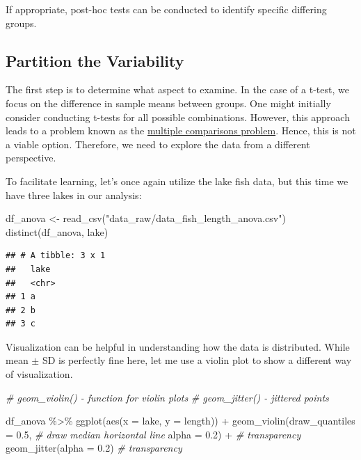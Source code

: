 \documentclass[
]{article}
\newenvironment{Shaded}{\begin{snugshade}}{\end{snugshade}}
\newcommand{\AttributeTok}[1]{\textcolor[rgb]{0.77,0.63,0.00}{#1}}
\newcommand{\CommentTok}[1]{\textcolor[rgb]{0.56,0.35,0.01}{\textit{#1}}}
\newcommand{\FloatTok}[1]{\textcolor[rgb]{0.00,0.00,0.81}{#1}}
\newcommand{\FunctionTok}[1]{\textcolor[rgb]{0.00,0.00,0.00}{#1}}
\newcommand{\NormalTok}[1]{#1}
\newcommand{\OtherTok}[1]{\textcolor[rgb]{0.56,0.35,0.01}{#1}}
\newcommand{\SpecialCharTok}[1]{\textcolor[rgb]{0.00,0.00,0.00}{#1}}
\newcommand{\StringTok}[1]{\textcolor[rgb]{0.31,0.60,0.02}{#1}}
\begin{document}
If appropriate, post-hoc tests can be conducted to identify specific differing groups.

\hypertarget{partition-the-variability}{%
\subsection{Partition the Variability}\label{partition-the-variability}}

The first step is to determine what aspect to examine. In the case of a t-test, we focus on the difference in sample means between groups. One might initially consider conducting t-tests for all possible combinations. However, this approach leads to a problem known as the \href{https://en.wikipedia.org/wiki/Multiple_comparisons_problem\#:~:text=In\%20statistics\%2C\%20the\%20multiple\%20comparisons,based\%20on\%20the\%20observed\%20values.}{multiple comparisons problem}. Hence, this is not a viable option. Therefore, we need to explore the data from a different perspective.

To facilitate learning, let's once again utilize the lake fish data, but this time we have three lakes in our analysis:

\begin{Shaded}
\begin{Highlighting}[]
\NormalTok{df\_anova }\OtherTok{\textless{}{-}} \FunctionTok{read\_csv}\NormalTok{(}\StringTok{"data\_raw/data\_fish\_length\_anova.csv"}\NormalTok{)}
\FunctionTok{distinct}\NormalTok{(df\_anova, lake)}
\end{Highlighting}
\end{Shaded}

\begin{verbatim}
## # A tibble: 3 x 1
##   lake 
##   <chr>
## 1 a    
## 2 b    
## 3 c
\end{verbatim}

Visualization can be helpful in understanding how the data is distributed. While mean \(\pm\) SD is perfectly fine here, let me use a violin plot to show a different way of visualization.

\begin{Shaded}
\begin{Highlighting}[]
\CommentTok{\# geom\_violin() {-} function for violin plots}
\CommentTok{\# geom\_jitter() {-} jittered points}

\NormalTok{df\_anova }\SpecialCharTok{\%\textgreater{}\%} 
  \FunctionTok{ggplot}\NormalTok{(}\FunctionTok{aes}\NormalTok{(}\AttributeTok{x =}\NormalTok{ lake,}
             \AttributeTok{y =}\NormalTok{ length)) }\SpecialCharTok{+}
  \FunctionTok{geom\_violin}\NormalTok{(}\AttributeTok{draw\_quantiles =} \FloatTok{0.5}\NormalTok{, }\CommentTok{\# draw median horizontal line}
              \AttributeTok{alpha =} \FloatTok{0.2}\NormalTok{) }\SpecialCharTok{+} \CommentTok{\# transparency}
  \FunctionTok{geom\_jitter}\NormalTok{(}\AttributeTok{alpha =} \FloatTok{0.2}\NormalTok{) }\CommentTok{\# transparency}
\end{Highlighting}
\end{Shaded}
\end{document}
